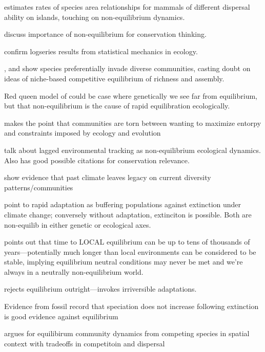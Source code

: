 \documentclass[12pt]{article}
\begin{document}
\cite{Lowlor1986} estimates rates of species area relationships for
mammals of different dispersal ability on islands, touching on
non-equilibrium dynamics.

\cite{Wallington2005} discuss importance of non-equilibrium for
conservation thinking.

\cite{Bowler2012} confirm logseries results from statistical mechanics
in ecology.

\cite{Sax2002}, \cite{Sax2003} and \cite{Sax2007} show species
preferentially invade diverse communities, casting doubt on ideas of
niche-based competitive equilibrium of richness and assembly.

Red queen model of \cite{Odwyer2014} could
be case where genetically we see far from equilibrium, but that
non-equilibrium is the cause of rapid equilibration ecologically.

\cite{He2010} makes the point that communities are torn between
wanting to maximize entorpy and constraints imposed by ecology and
evolution

\cite{Blonder2017} talk about lagged environmental tracking as
non-equilibrium ecological dynamics.  Also has good possible citations
for conservation relevance.

\cite{Svenning2015} show evidence that past climate leaves legacy on
current diversity patterns/communities

\cite{Hoffmann2011} point to rapid adaptation as buffering populations
against extinction under climate change; conversely without
adaptation, extinciton is possible.  Both are non-equilib in either
genetic or ecological axes.

\cite{McGill2003} points out that time to LOCAL equilibrium can be up
to tens of thousands of years---potentially much longer than local
environments can be considered to be stable, implying equilibrium
neutral conditions may never be met and we're always in a neutrally
non-equilibrium world.

\cite{Hengeveld1994} rejects equilibrium outright---invokes
irriversible adaptations.

Evidence from fossil record that speciation does not increase
following extinction is good evidence against equilibrium

\cite{Tilman1994} argues for equilibirum community dynamics from
competing species in spatial context with tradeoffs in competitoin and
dispersal



\end{document}
